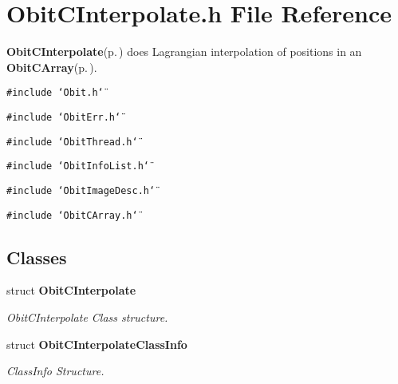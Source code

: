 \section{Obit\-CInterpolate.h File Reference}
\label{ObitCInterpolate_8h}
{\bf Obit\-CInterpolate}{\rm (p.\,\pageref{structObitCInterpolate})} does Lagrangian interpolation of positions in an {\bf Obit\-CArray}{\rm (p.\,\pageref{structObitCArray})}. 

{\tt \#include \char`\"{}Obit.h\char`\"{}}\par
{\tt \#include \char`\"{}Obit\-Err.h\char`\"{}}\par
{\tt \#include \char`\"{}Obit\-Thread.h\char`\"{}}\par
{\tt \#include \char`\"{}Obit\-Info\-List.h\char`\"{}}\par
{\tt \#include \char`\"{}Obit\-Image\-Desc.h\char`\"{}}\par
{\tt \#include \char`\"{}Obit\-CArray.h\char`\"{}}\par
\subsection*{Classes}
\begin{CompactItemize}
\item 
struct {\bf Obit\-CInterpolate}
\begin{CompactList}\small\item\em Obit\-CInterpolate Class structure. \item\end{CompactList}\item 
struct {\bf Obit\-CInterpolate\-Class\-Info}
\begin{CompactList}\small\item\em Class\-Info Structure. \item\end{CompactList}\end{CompactItemize}

